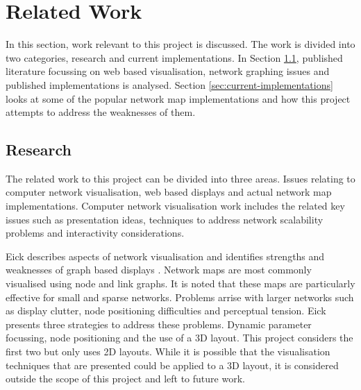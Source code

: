 \documentclass[11pt, a4paper]{article}
\begin{document}
\newpage

\section{Related Work}
\label{sec:related-work}

In this section, work relevant to this project is discussed. The work is divided
into two categories, research and current implementations. In Section
\ref{sec:research}, published literature focussing on web based visualisation,
network graphing issues and published implementations is analysed. Section
\ref{sec:current-implementations} looks at some of the popular network map
implementations and how this project attempts to address the weaknesses of them.

\subsection{Research}
\label{sec:research}

The related work to this project can be divided into three areas. Issues
relating to computer network visualisation, web based displays and actual
network map implementations. Computer network visualisation work includes the
related key issues such as presentation ideas, techniques to address network
scalability problems and interactivity considerations.

Eick describes aspects of network visualisation and identifies strengths and
weaknesses of graph based displays \cite{Eick_1996}. Network maps are most
commonly visualised using node and link graphs. It is noted that these maps are
particularly effective for small and sparse networks. Problems arrise with
larger networks such as display clutter, node positioning difficulties and
perceptual tension. Eick presents three strategies to address these problems.
Dynamic parameter focussing, node positioning and the use of a 3D layout. This
project considers the first two but only uses 2D layouts. While it is possible
that the visualisation techniques that are presented could be applied to a 3D
layout, it is considered outside the scope of this project and left to future
work.
\end{document}
